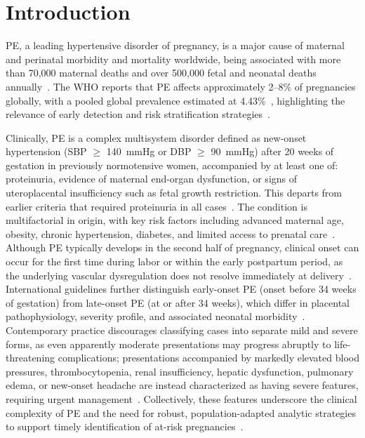 \documentclass[diagnostics,article,accept,pdftex,moreauthors]{Definitions/mdpi}
\begin{document}

\section{Introduction}
\label{sec:introduction}
\Ac{PE}, a leading hypertensive disorder of pregnancy, is
a major cause of maternal and perinatal morbidity and mortality
worldwide, being associated with more than {70,000}
maternal deaths and over {500,000} fetal and neonatal deaths
annually~\cite{vera2025preeclampsia}. The \ac{WHO} reports that \ac{PE}
affects approximately 2--8\% of pregnancies globally, with
a pooled global prevalence estimated at 4.43\%~\cite{vera2025preeclampsia},
highlighting the relevance of early detection and risk stratification
strategies~\cite{who_2025_preeclampsia,vera2025preeclampsia}.

Clinically, \ac{PE} is a complex multisystem disorder
defined as new-onset hypertension (\ac{SBP} $\geq$ 140~mmHg or
\ac{DBP} $\geq$ 90~mmHg) after 20 weeks of gestation in previously
normotensive women, accompanied by at least one of: proteinuria,
evidence of maternal end-organ dysfunction, or signs of uteroplacental
insufficiency such as fetal growth restriction. This departs from earlier
criteria that required proteinuria in all
cases~\cite{brown2018isshp,vera2025preeclampsia}. The condition is
multifactorial in origin, with key risk factors including advanced
maternal age, obesity, chronic hypertension, diabetes, and limited
access to prenatal care~\cite{vera2025preeclampsia}. Although \ac{PE}
typically develops in the second half of pregnancy, clinical onset can
occur for the first time during labor or within the early postpartum
period, as the underlying vascular dysregulation does not resolve
immediately at delivery~\cite{brown2018isshp}.
International guidelines further distinguish early-onset \ac{PE} (onset
before 34 weeks of gestation) from late-onset \ac{PE} (at or after 34
weeks), which differ in placental pathophysiology, severity profile, and
associated neonatal morbidity~\cite{brown2018isshp}. Contemporary
practice discourages classifying cases into separate mild and severe
forms, as even apparently moderate presentations may progress abruptly
to life-threatening complications; presentations accompanied by markedly
elevated blood pressures, thrombocytopenia, renal insufficiency, hepatic
dysfunction, pulmonary edema, or new-onset headache are instead
characterized as having severe features, requiring urgent
management~\cite{brown2018isshp}. Collectively, these features underscore
the clinical complexity of \ac{PE} and the need for robust,
population-adapted analytic strategies to support timely identification
of at-risk pregnancies~\cite{vera2025preeclampsia}.
\end{document}
